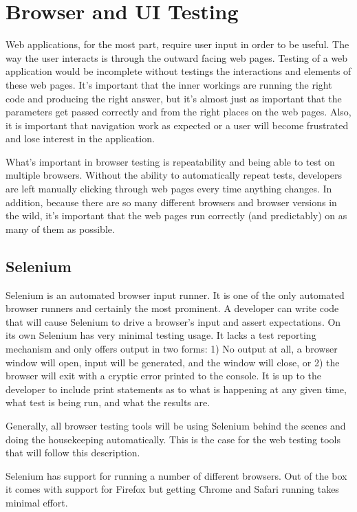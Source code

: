 \documentclass[12pt]{ucthesis}
\begin{document}
\section{Browser and UI Testing}
Web applications, for the most part, require user input in order to be useful. The way the user interacts is through the outward facing web pages. Testing of a web application would be incomplete without testings the interactions and elements of these web pages. It's important that the inner workings are running the right code and producing the right answer, but it's almost just as important that the parameters get passed correctly and from the right places on the web pages. Also, it is important that navigation work as expected or a user will become frustrated and lose interest in the application.

What's important in browser testing is repeatability and being able to test on multiple browsers. Without the ability to automatically repeat tests, developers are left manually clicking through web pages every time anything changes. In addition, because there are so many different browsers and browser versions in the wild, it's important that the web pages run correctly (and predictably) on as many of them as possible.

\subsection{Selenium}
Selenium\cite{Selenium} is an automated browser input runner. It is one of the only automated browser runners and certainly the most prominent. A developer can write code that will cause Selenium to drive a browser's input and assert expectations. On its own Selenium has very minimal testing usage. It lacks a test reporting mechanism and only offers output in two forms: 1) No output at all, a browser window will open, input will be generated, and the window will close, or 2) the browser will exit with a cryptic error printed to the console. It is up to the developer to include print statements as to what is happening at any given time, what test is being run, and what the results are.

Generally, all browser testing tools will be using Selenium behind the scenes and doing the housekeeping automatically. This is the case for the web testing tools that will follow this description.

Selenium has support for running a number of different browsers. Out of the box it comes with support for Firefox but getting Chrome and Safari running takes minimal effort.
\end{document}
